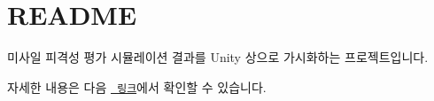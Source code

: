 \chapter{README}
\hypertarget{md__r_e_a_d_m_e}{}\label{md__r_e_a_d_m_e}
미사일 피격성 평가 시뮬레이션 결과를 Unity 상으로 가시화하는 프로젝트입니다.

자세한 내용은 다음 \href{https://snupel.github.io/SSA/index.html}{\texttt{ 링크}}에서 확인할 수 있습니다. 